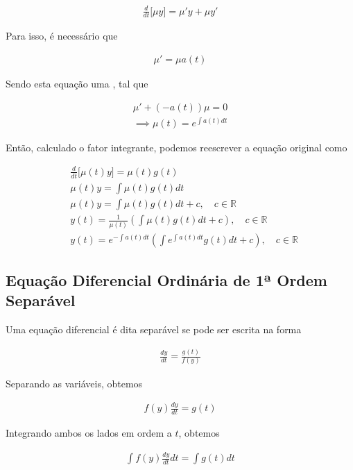 \documentclass{article}
\begin{document}
\begin{gather*}
\frac{d}{dt} \Big[ \mu y \Big] = \mu' y + \mu y'
\end{gather*}

Para isso, é necessário que

\begin{gather*}
\mu' = \mu a(t)
\end{gather*}

Sendo esta equação uma , tal que

\begin{gather*}
\mu' + (-a(t)) \mu = 0 \\
\implies \mu(t) = e^{\int a(t) dt}
\end{gather*}

Então, calculado o fator integrante, podemos reescrever a equação original como

\begin{align*}
& \frac{d}{dt} \Big[ \mu(t) y \Big] = \mu(t) g(t) \\
& \mu(t) y= \int \mu(t) g(t) dt \\
& \mu(t) y = \int \mu(t) g(t) dt + c, \quad c \in \mathbb{R} \\
& y(t) = \frac{1}{\mu(t)} \left( \int \mu(t) g(t) dt + c \right), \quad c \in \mathbb{R} \\
& \boxed{y(t) = e^{-\int a(t) dt} \left( \int e^{\int a(t) dt} g(t) dt + c \right), \quad c \in \mathbb{R}}
\end{align*}

\bigskip

\subsection{Equação Diferencial Ordinária de 1ª Ordem Separável}

Uma equação diferencial é dita separável se pode ser escrita na forma

\begin{gather*}
\boxed{\frac{dy}{dt} = \frac{g(t)}{f(y)}}
\end{gather*}

Separando as variáveis, obtemos

\begin{gather*}
f(y) \frac{dy}{dt} = g(t)
\end{gather*}

Integrando ambos os lados em ordem a $t$, obtemos

\begin{gather*}
\int f(y) \frac{dy}{dt} dt = \int g(t) dt
\end{gather*}
\end{document}

